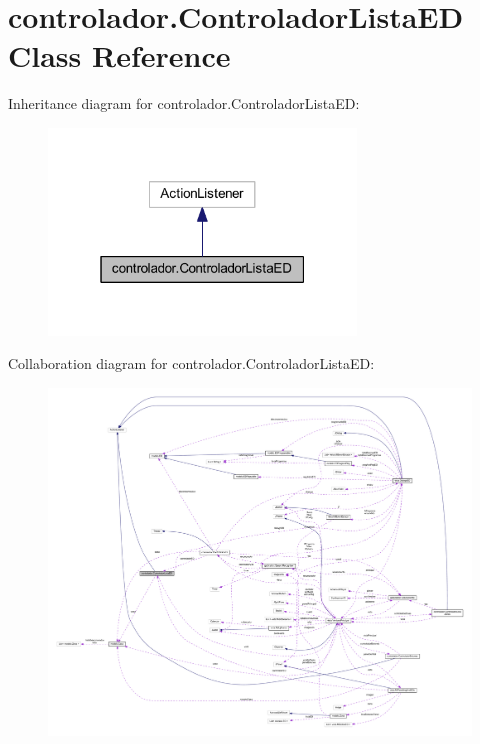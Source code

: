 \hypertarget{classcontrolador_1_1_controlador_lista_e_d}{}\section{controlador.\+Controlador\+Lista\+ED Class Reference}
\label{classcontrolador_1_1_controlador_lista_e_d}


Inheritance diagram for controlador.\+Controlador\+Lista\+ED\+:
\nopagebreak
\begin{figure}[H]
\begin{center}
\leavevmode
\includegraphics[width=232pt]{classcontrolador_1_1_controlador_lista_e_d__inherit__graph}
\end{center}
\end{figure}


Collaboration diagram for controlador.\+Controlador\+Lista\+ED\+:
\nopagebreak
\begin{figure}[H]
\begin{center}
\leavevmode
\includegraphics[width=350pt]{classcontrolador_1_1_controlador_lista_e_d__coll__graph}
\end{center}
\end{figure}
